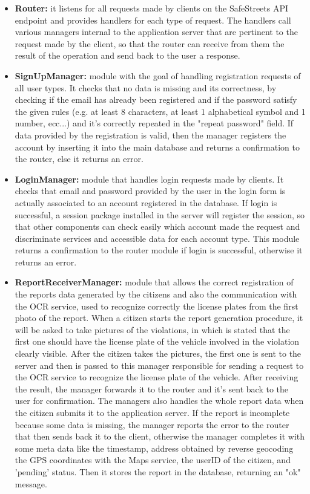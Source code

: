 \begin{itemize}
	\item \textbf{Router:} 
	it listens for all requests made by clients on the SafeStreets API endpoint and provides handlers for each type of request. The handlers call various managers internal to the application server that are pertinent to the request made by the client, so that the router can receive from them the result of the operation and send back to the user a response.
	\item \textbf{SignUpManager:}
	module with the goal of handling registration requests of all user types. It checks that no data is missing and its correctness, by checking if the email has already been registered and if the password satisfy the given rules (e.g. at least 8 characters, at least 1 alphabetical symbol and 1 number, ecc...) and it's correctly repeated in the "repeat password" field. If data provided by the registration is valid, then the manager registers the account by inserting it into the main database and returns a confirmation to the router, else it returns an error.
	\item \textbf{LoginManager:}
	module that handles login requests made by clients. It checks that email and password provided by the user in the login form is actually associated to an account registered in the database. If login is successful, a session package installed in the server will register the session, so that other components can check easily which account made the request and discriminate services and accessible data for each account type. This module returns a confirmation to the router module if login is successful, otherwise it returns an error.
	\item \textbf{ReportReceiverManager:}
	module that allows the correct registration of the reports data generated by the citizens and also the communication with the OCR service, used to recognize correctly the license plates from the first photo of the report. When a citizen starts the report generation procedure, it will be asked to take pictures of the violations, in which is stated that the first one should have the license plate of the vehicle involved in the violation clearly visible. After the citizen takes the pictures, the first one is sent to the server and then is passed to this manager responsible for sending a request to the OCR service to recognize the license plate of the vehicle. After receiving the result, the manager forwards it to the router and it's sent back to the user for confirmation. The managers also handles the whole report data when the citizen submits it to the application server. If the report is incomplete because some data is missing, the manager reports the error to the router that then sends back it to the client, otherwise the manager completes it with some meta data like the timestamp, address obtained by reverse geocoding the GPS coordinates with the Maps service, the userID of the citizen, and 'pending' status. Then it stores the report in the database, returning an "ok" message.

\end{itemize}
